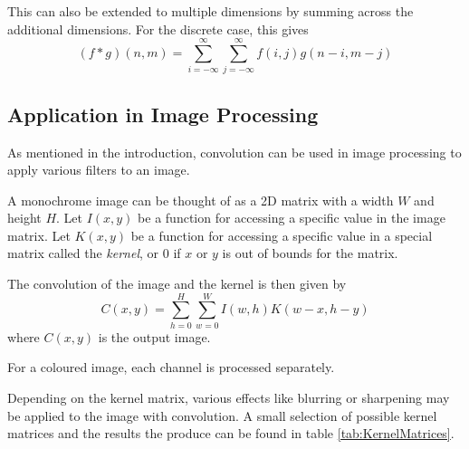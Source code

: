 This can also be extended to multiple dimensions by summing across the additional dimensions.
For the discrete case, this gives
\[
    (f * g)(n, m) = \sum^{\infty}_{i=-\infty}\sum^{\infty}_{j=-\infty}{f(i, j)g(n-i, m-j)}
\]

\subsection{Application in Image Processing}
As mentioned in the introduction, convolution can be used in image processing to apply various filters to an image.

A monochrome image can be thought of as a 2D matrix with a width $W$ and height $H$.
Let $I(x, y)$ be a function for accessing a specific value in the image matrix.
Let $K(x, y)$ be a function for accessing a specific value in a special matrix called the \textit{kernel},
or $0$ if $x$ or $y$ is out of bounds for the matrix.

The convolution of the image and the kernel is then given by
\[
    C(x, y) = \sum^{H}_{h=0} \sum^{W}_{w=0}{I(w, h)K(w - x, h -y)}
\]
where $C(x, y)$ is the output image.

For a coloured image, each channel is processed separately.

Depending on the kernel matrix, various effects like blurring or sharpening may be applied to the image with convolution.
A small selection of possible kernel matrices and the results the produce can be found in table \ref{tab:KernelMatrices}.

